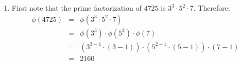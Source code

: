\begin{enumerate}

    \item First note that the prime factorization of $4725$ is $3^{3} \cdot 5^{2} \cdot 7$.
    Therefore:
    \begin{eqnarray*}
        \phi(4725) &=& \phi(3^{3} \cdot 5^{2} \cdot 7) \\
        &=& \phi(3^{3}) \cdot \phi(5^{2}) \cdot \phi(7) \\
        &=& (3^{3-1} \cdot (3 - 1)) \cdot (5^{2-1} \cdot (5 - 1)) \cdot (7 - 1) \\
        &=& 2160
    \end{eqnarray*}



\end{enumerate}
